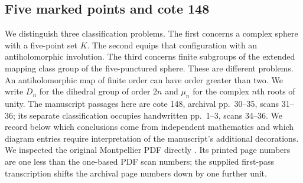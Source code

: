 \subsection{Five marked points and cote 148}
\label{sec:E2}

We distinguish three classification problems.  The first concerns
a complex sphere with a five-point set $K$.  The second equips
that configuration with an antiholomorphic involution.  The third
concerns finite subgroups of the extended mapping class group of
the five-punctured sphere.  These are different problems.
An antiholomorphic map of finite order can have order greater than two.
We write $D_n$ for the
dihedral group of order $2n$ and $\mu_n$ for the complex $n$th roots
of unity.  The manuscript passages here are cote 148, archival
pp.~30--35, scans 31--36; its separate classification occupies
handwritten pp.~1--3, scans 34--36.  We record below which conclusions
come from independent mathematics and which diagram entries require
interpretation of the manuscript's additional decorations.  We inspected
the original Montpellier PDF directly \cite{DE_Grothendieck148}.  Its printed page numbers are
one less than the one-based PDF scan numbers; the supplied first-pass
transcription shifts the archival page numbers down by one further unit.

